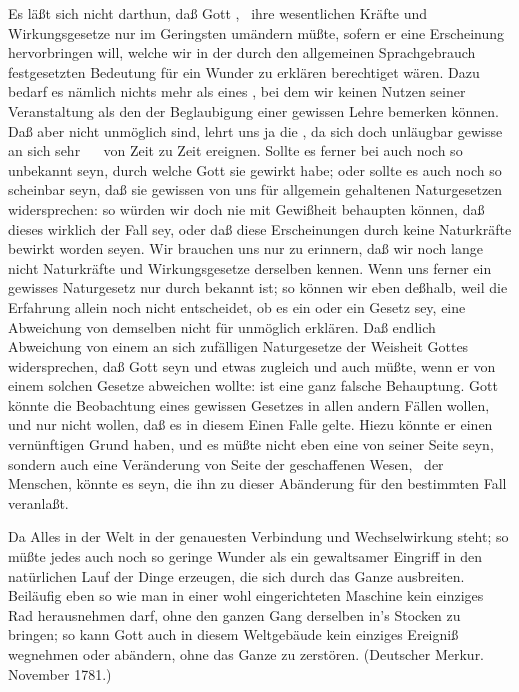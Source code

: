  Es läßt sich nicht darthun, daß Gott , \dh\ ihre wesentlichen Kräfte und Wirkungsgesetze nur im Geringsten umändern müßte, sofern er eine Erscheinung hervorbringen will, welche wir in der durch den allgemeinen Sprachgebrauch festgesetzten Bedeutung für ein Wunder zu erklären berechtiget wären. Dazu bedarf es nämlich nichts mehr als eines , bei dem wir keinen Nutzen seiner Veranstaltung als den der Beglaubigung einer gewissen Lehre bemerken können. Daß aber  nicht unmöglich sind, lehrt uns ja die , da sich doch unläugbar gewisse an sich sehr ~\   von Zeit zu Zeit ereignen. Sollte es ferner bei  auch noch so unbekannt seyn, durch welche  Gott sie gewirkt habe; oder sollte es auch noch so scheinbar seyn, daß sie gewissen von uns für allgemein gehaltenen Naturgesetzen widersprechen: so würden wir doch nie mit Gewißheit behaupten können, daß dieses wirklich der Fall sey, oder daß diese Erscheinungen durch keine Naturkräfte bewirkt worden seyen. Wir brauchen uns nur zu erinnern, daß wir noch lange nicht  Naturkräfte und Wirkungsgesetze derselben kennen. Wenn uns ferner ein gewisses Naturgesetz nur durch  bekannt ist; so können wir eben deßhalb, weil die Erfahrung allein noch nicht entscheidet, ob es ein  oder ein  Gesetz sey, eine Abweichung von demselben nicht für unmöglich erklären. Daß endlich  Abweichung von einem an sich zufälligen Naturgesetze der Weisheit Gottes widersprechen, daß Gott  seyn und etwas zugleich  und auch  müßte, wenn er von einem solchen Gesetze abweichen wollte: ist eine ganz falsche Behauptung. Gott könnte die Beobachtung eines gewissen Gesetzes in allen andern Fällen wollen, und nur nicht wollen, daß es in diesem Einen Falle gelte. Hiezu könnte er einen vernünftigen Grund haben, und es müßte nicht eben eine  von seiner Seite seyn, sondern auch eine Veränderung von Seite der geschaffenen Wesen, \zB\ der Menschen, könnte es seyn, die ihn zu dieser Abänderung für den bestimmten Fall veranlaßt.\par
{} Da Alles in der Welt in der genauesten Verbindung und Wechselwirkung steht; so müßte jedes auch noch so geringe Wunder als ein gewaltsamer Eingriff in den natürlichen Lauf der Dinge  erzeugen, die sich durch das Ganze ausbreiten. Beiläufig eben so wie man in einer wohl eingerichteten Maschine kein einziges Rad herausnehmen darf, ohne den ganzen Gang derselben in's Stocken zu bringen; so kann Gott auch in diesem Weltgebäude kein einziges Ereigniß wegnehmen oder abändern, ohne das Ganze zu zerstören. (Deutscher Merkur. November 1781.)~\par
